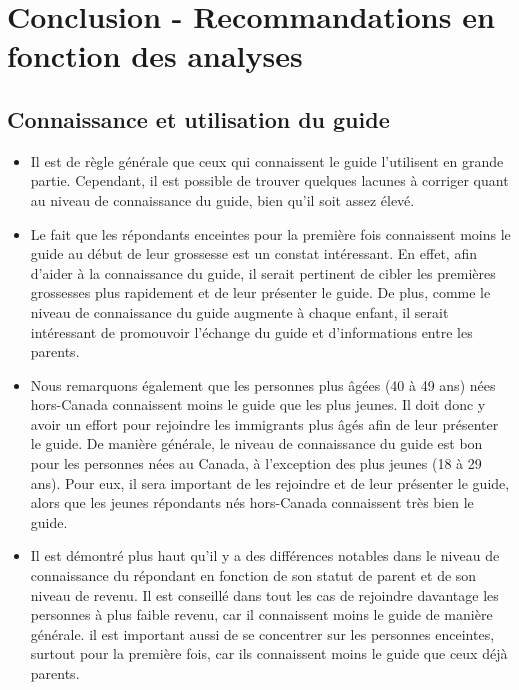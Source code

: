\documentclass[
]{article}
\providecommand{\tightlist}{%
  \setlength{\itemsep}{0pt}\setlength{\parskip}{0pt}}
\begin{document}
\newpage

\hypertarget{conclusion---recommandations-en-fonction-des-analyses}{%
\section{Conclusion - Recommandations en fonction des
analyses}\label{conclusion---recommandations-en-fonction-des-analyses}}

\hypertarget{connaissance-et-utilisation-du-guide}{%
\subsection{Connaissance et utilisation du
guide}\label{connaissance-et-utilisation-du-guide}}

\begin{itemize}
\tightlist
\item
  Il est de règle générale que ceux qui connaissent le guide l'utilisent
  en grande partie. Cependant, il est possible de trouver quelques
  lacunes à corriger quant au niveau de connaissance du guide, bien
  qu'il soit assez élevé.
\item
  Le fait que les répondants enceintes pour la première fois connaissent
  moins le guide au début de leur grossesse est un constat intéressant.
  En effet, afin d'aider à la connaissance du guide, il serait pertinent
  de cibler les premières grossesses plus rapidement et de leur
  présenter le guide. De plus, comme le niveau de connaissance du guide
  augmente à chaque enfant, il serait intéressant de promouvoir
  l'échange du guide et d'informations entre les parents.
\item
  Nous remarquons également que les personnes plus âgées (40 à 49 ans)
  nées hors-Canada connaissent moins le guide que les plus jeunes. Il
  doit donc y avoir un effort pour rejoindre les immigrants plus âgés
  afin de leur présenter le guide. De manière générale, le niveau de
  connaissance du guide est bon pour les personnes nées au Canada, à
  l'exception des plus jeunes (18 à 29 ans). Pour eux, il sera important
  de les rejoindre et de leur présenter le guide, alors que les jeunes
  répondants nés hors-Canada connaissent très bien le guide.
\item
  Il est démontré plus haut qu'il y a des différences notables dans le
  niveau de connaissance du répondant en fonction de son statut de
  parent et de son niveau de revenu. Il est conseillé dans tout les cas
  de rejoindre davantage les personnes à plus faible revenu, car il
  connaissent moins le guide de manière générale. il est important aussi
  de se concentrer sur les personnes enceintes, surtout pour la première
  fois, car ils connaissent moins le guide que ceux déjà parents.
\end{itemize}
\end{document}
